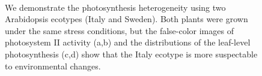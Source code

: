 \documentclass{bioinfo}
\begin{document}
\begin{figure}[tb]
\centering
{}~~~~~~~~~~
\vspace{-0.05in}
~~~
 \vspace{-0.2in}
\caption{\scriptsize We demonstrate the photosynthesis heterogeneity using two Arabidopsis ecotypes (Italy and Sweden). Both plants were grown under the same stress conditions, but the false-color images of photosystem II activity (a,b) and the distributions of the leaf-level photosynthesis (c,d) show that the Italy ecotype is more suspectable to environmental changes. \vspace{-0.3in} } \label{fig:heterogeneityexample}
\end{figure}
\end{document}
